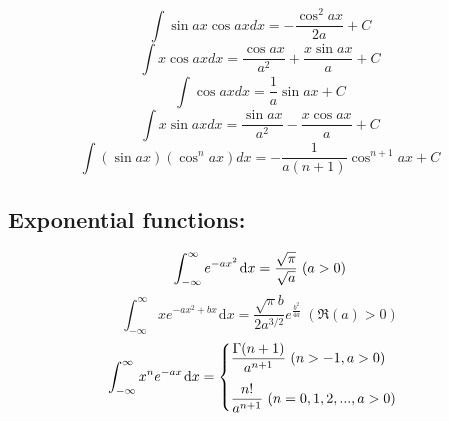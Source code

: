 \documentclass[12pt,a4paper]{article}
\begin{document}
	\begin{equation}
		\int \sin ax \cos ax dx = - \frac{\cos^2 ax}{2a} + C
	\end{equation}
	\begin{equation}
		\int x \cos ax dx = \frac{\cos ax}{a^2} + \frac{x \sin ax}{a} + C
	\end{equation}
	\begin{equation}
		\int \cos ax dx = \frac{1}{a} \sin ax + C
	\end{equation}
	\begin{equation}
		\int x \sin ax dx = \frac{\sin ax }{a^2} -\frac{x \cos ax }{a} + C
	\end{equation}
	\begin{equation}
		\int (\sin ax) (\cos^n ax) dx = - \frac{1}{a ( n + 1)} \cos ^{n+1} ax + C
	\end{equation}
	
	
	\subsection*{Exponential functions:}

		
		
		
		
		\begin{equation}
			\int_{-\infty}^\infty e^{-ax^2}\hspace{1pt}\text{d}x = \frac{\sqrt{\pi}}{\sqrt{a}} \hspace*{3pt}(a > 0)
		\end{equation}
		\begin{equation}
			\int_{-\infty}^\infty x e^{-ax^2 + bx}\hspace{1pt}\text{d}x = \frac{\sqrt{\pi} b}{2a^{3/2}} e^{\frac{b^2}{4a}} \hspace{3pt}(\Re(a) > 0)
		\end{equation}
		\begin{equation}
			\int_{-\infty}^\infty x^n e^{-ax} \hspace{1pt} \text{d}x = \begin{cases}
				\dfrac{\Gamma (n+1)}{a^{n+1}} \hspace*{3pt} (n>-1, a>0)\\[.15in]
				\dfrac{n!}{a^{n+1}} \hspace*{3pt} (n=0,1,2,..., a>0)
			\end{cases}
		\end{equation}
		
\end{document}

